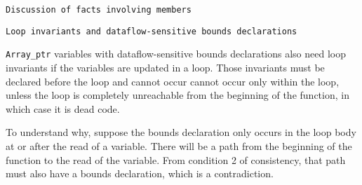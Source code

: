\texttt{Discussion of facts involving members}


\begin{quote}


\end{quote}

\texttt{Loop invariants and dataflow-sensitive bounds declarations}

\texttt{Array\_ptr} variables with dataflow-sensitive bounds declarations also
need loop invariants if the variables are updated in a loop. Those
invariants must be declared before the loop and cannot occur cannot
occur only within the loop, unless the loop is completely unreachable
from the beginning of the function, in which case it is dead code.

To understand why, suppose the bounds declaration only occurs in the
loop body at or after the read of a variable. There will be a path from
the beginning of the function to the read of the variable. From
condition 2 of consistency, that path must also have a bounds
declaration, which is a contradiction.